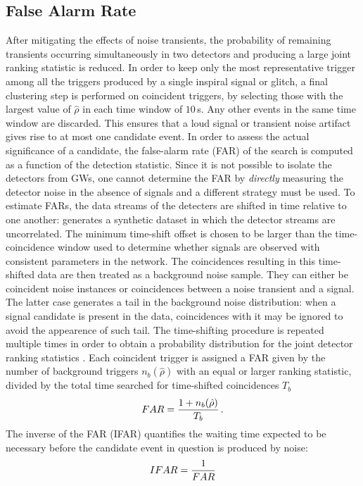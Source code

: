 \documentclass[binding=0.6cm, LaM]{sapthesis}
\begin{document}
\subsection{False Alarm Rate}
\label{subsec:far}
	After mitigating the effects of noise transients, the probability of remaining transients 
	occurring simultaneously in two detectors and producing a large joint 
	ranking statistic is reduced.
	In order to keep only the most representative trigger among all the triggers produced by a single inspiral signal or glitch, 
	a final clustering step is performed on coincident triggers, 
	by selecting those with the largest value of $\hat \rho$ 
	in each time window of $10$\,s. 
	Any other events in the same time window are discarded. 
	This ensures that a loud signal or transient noise artifact gives rise to at most one candidate event.
	In order to assess the actual significance of a candidate, 
	the false-alarm rate (FAR) of the search is computed as a function of the detection statistic.
  	Since it is not possible to isolate the detectors from GWs, 
	one cannot determine the FAR by \emph{directly} measuring the detector noise in the absence 
	of signals and a different strategy must be used.
 	To estimate FARs, the data streams of the detecters are shifted in time relative to one another: 
	generates a synthetic dataset in which the detector streams are uncorrelated.  
	The minimum time-shift offset is chosen to be larger than the time-coincidence window 
	used to determine whether signals are observed with consistent parameters in the network.
	The coincidences resulting in this time-shifted data are then treated as a background noise sample.  
	They can either be coincident noise instances or coincidences between a noise transient and a signal.  
	The latter case generates a tail in the background noise distribution: 
	when a signal candidate is present in the data, coincidences with it 
	may be ignored to avoid the appearence of such tail.
	The time-shifting procedure is repeated multiple times in order to obtain a probability distribution 
	for the joint detector ranking statistics \cite{44}. 
	Each coincident trigger is assigned a FAR given by the number 
	of background triggers $n_b(\hat \rho)$ with an equal or larger ranking statistic, 
	divided by the total time searched for time-shifted coincidences $T_b$
        \begin{equation}
          FAR = {{1 + n_b(\hat \rho)} \over {T_b}}\,.
        \end{equation}
        The inverse of the FAR (IFAR) quantifies the waiting time expected to be necessary 
	before the candidate event in question is produced by noise:
        \begin{equation}
          IFAR = {1 \over {FAR}}
        \end{equation}
\end{document}
